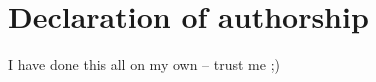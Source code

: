 \chapter*{Declaration of authorship}
\thispagestyle{empty}

I have done this all on my own -- trust me ;)
